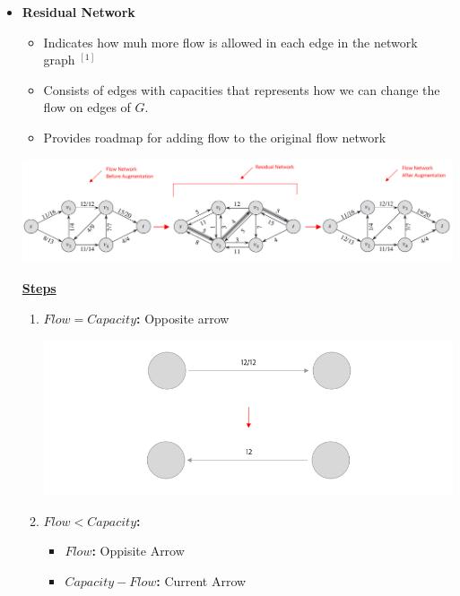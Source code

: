 \documentclass[12pt]{article}
\begin{document}
\begin{enumerate}[1.]
\begin{itemize}
        \item \textbf{Residual Network}
        \begin{itemize}
            \item Indicates how muh more flow is allowed in each edge in the network graph $^{[1]}$
            \item Consists of edges with capacities that represents how we can change the flow on edges of $G$.
            \item Provides roadmap for adding flow to the original flow network
        \end{itemize}

        \bigskip

        \begin{center}
        \includegraphics[width=\linewidth]{images/worksheet_5_solution_12.png}
        \end{center}

        \bigskip

        \underline{\textbf{Steps}}

        \bigskip

        \begin{enumerate}[1)]
            \item \textbf{$Flow = Capacity$:} Opposite arrow

            \begin{center}
            \includegraphics[width=0.8\linewidth]{images/worksheet_5_solution_10.png}
            \end{center}

            \item \textbf{$Flow < Capacity$:}

            \begin{itemize}
                \item \textbf{$Flow$:} Oppisite Arrow
                \item \textbf{$Capacity - Flow$:} Current Arrow
            \end{itemize}


\end{enumerate}
\end{itemize}
\end{enumerate}
\end{document}
